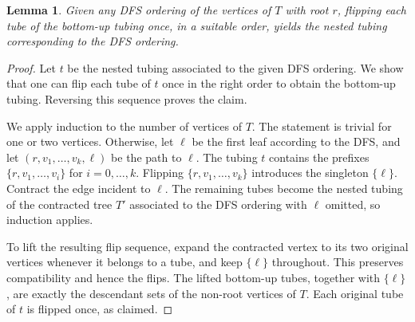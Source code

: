 \documentclass[fontsize=11pt,a4paper,DIV=12]{scrartcl}
\newtheorem{lemma}[theorem]{Lemma}
\begin{document}
\begin{lemma}\label{lem:bottom-up}
		Given any DFS ordering of the vertices of $T$ with root $r$, flipping each tube of the bottom-up tubing once, in a suitable order, yields the nested tubing corresponding to the DFS ordering.
	\end{lemma}
	\begin{proof}
		Let $t$ be the nested tubing associated to the given DFS ordering. We show that one can flip each tube of $t$ once in the right order to obtain the bottom-up tubing. Reversing this sequence proves the claim.

		We apply induction to the number of vertices of $T$. The statement is trivial for one or two vertices. Otherwise, let $\ell$ be the first leaf according to the DFS, and let $(r,v_1,\ldots,v_k,\ell)$ be the path to $\ell$. The tubing $t$ contains the prefixes $\{r,v_1,\ldots,v_i\}$ for $i=0,\ldots,k$. Flipping $\{r,v_1,\ldots,v_k\}$ introduces the singleton $\{\ell\}$. Contract the edge incident to $\ell$. The remaining tubes become the nested tubing of the contracted tree $T'$ associated to the DFS ordering with $\ell$ omitted, so induction applies.

		To lift the resulting flip sequence, expand the contracted vertex to its two original vertices whenever it belongs to a tube, and keep $\{\ell\}$ throughout. This preserves compatibility and hence the flips. The lifted bottom-up tubes, together with $\{\ell\}$, are exactly the descendant sets of the non-root vertices of $T$. Each original tube of $t$ is flipped once, as claimed.
	\end{proof}
\end{document}

